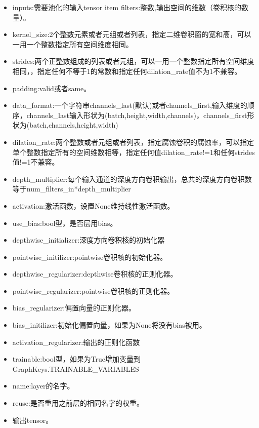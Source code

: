 \begin{itemize}
	\item inputs:需要池化的输入tensor
	item filters:整数,输出空间的维数（卷积核的数量）。
	\item kernel\_size:2个整数元素或者元组或者列表，指定二维卷积窗的宽和高，可以一用一个整数指定所有空间维度相同。
	\item strides:两个正整数组成的列表或者元组，可以一用一个整数指定所有空间维度相同，，指定任何不等于1的常数和指定任何dilation\_rate值不为1不兼容。
	\item padding:valid或者same。
	\item data\_format:一个字符串channels\_last(默认)或者channels\_first,输入维度的顺序，channels\_last输入形状为(batch,height,width,channels)，channels\_first形状为(batch,channels,height,width)
	\item dilation\_rate:两个整数或者元组或者列表，指定腐蚀卷积的腐蚀率，可以指定单个整数指定所有的空间维数相等，指定任何值dilation\_rate!=1和任何strides值!=1不兼容。
	\item depth\_multiplier:每个输入通道的深度方向卷积输出，总共的深度方向卷积数等于num\_filters\_in*depth\_multiplier
	\item activation:激活函数，设置None维持线性激活函数。
	\item use\_bias:bool型，是否层用bias。
	\item depthwise\_initializer:深度方向卷积核的初始化器
	\item pointwise\_initilizer:pointwise卷积核的初始化器。
	\item depthwise\_regularizer:depthwise卷积核的正则化器。
	\item pointwise\_regularizer:pointwise卷积核的正则化器。
	\item bias\_regularizer:偏置向量的正则化器。
	\item bias\_initilizer:初始化偏置向量，如果为None将没有bias被用。
	\item activation\_regularizer:输出的正则化函数
	\item trainable:bool型，如果为True增加变量到GraphKeys.TRAINABLE\_VARIABLES
	\item name:layer的名字。
	\item reuse:是否重用之前层的相同名字的权重。
	\item 输出tensor。

\end{itemize}